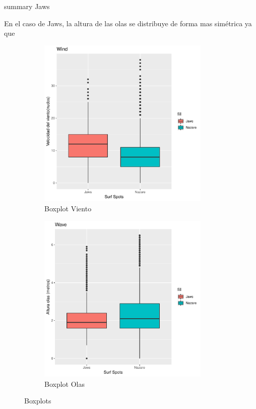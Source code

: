 \begin{table}[htbp]
\centering

\caption{summary Jaws}
\label{tab:summary_jaws}
\end{table}

En el caso de Jaws, la altura de las olas se distribuye de forma mas simétrica ya que 

\begin{figure}[!ht]
\begin{subfigure}{.49\textwidth}
\label{fig:boxplot_wind}
\centering
\includegraphics[width=0.9\textwidth]{./figures/boxplot_wind.pdf}
  \caption{Boxplot Viento}
\end{subfigure}%
\begin{subfigure}{.49\textwidth}
\label{fig:boxplot_wave}
\centering
\includegraphics[width=0.9\textwidth]{./figures/boxplot_wave.pdf}
  \caption{Boxplot Olas}
\end{subfigure}
\caption{Boxplots}
\end{figure}

